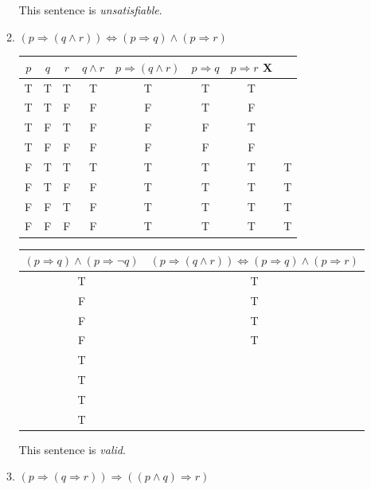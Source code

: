 \documentclass{article}
\begin{document}
\begin{enumerate}
\begin{enumerate}
				This sentence is \emph{unsatisfiable}.
				
			\item $(p \Rightarrow ( q \wedge r)) \Leftrightarrow (p \Rightarrow q) \wedge (p \Rightarrow r)$
			
				\begin{tabular}{|c|c|c|c|c|c|c|c|}
					\hline
					$p$ & $q$ & $r$ & $q \wedge r$ & $p \Rightarrow (q \wedge r)$ & $p \Rightarrow q$ 
					& $p \Rightarrow r$ X\\
					\hline
					T & T & T & T & T & T & T \\
					\hline
					T & T & F & F & F & T & F &\\
					\hline
					T & F & T & F & F & F & T & \\
					\hline
					T & F & F & F & F & F & F & \\
					\hline
					F & T & T & T & T & T & T & T\\
					\hline
					F & T & F & F & T & T & T & T\\
					\hline
					F & F & T & F & T & T & T & T\\
					\hline
					F & F & F & F & T & T & T & T \\
					\hline
				\end{tabular}

				\begin{tabular}{|c|c|}
					\hline
					$(p \Rightarrow q) \wedge ( p \Rightarrow \neg q)$ &
					 $(p \Rightarrow ( q \wedge r)) \Leftrightarrow (p \Rightarrow q) \wedge (p \Rightarrow r)$ \\
					\hline
					T & T \\
					\hline
					F & T \\
					\hline
					F & T \\
					\hline
					F & T \\
					\hline
					T \\
					\hline
					T \\
					\hline
					T \\
					\hline
					T \\
					\hline
				\end{tabular}

				This sentence is \emph{valid}.

				\item $(p \Rightarrow (q \Rightarrow r)) \Rightarrow ((p \wedge q) \Rightarrow r)$


\end{enumerate}
\end{enumerate}
\end{document}

